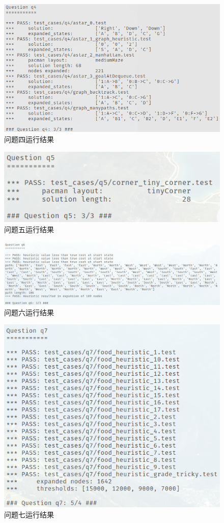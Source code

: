\documentclass[12pt,onecolumn]{report}
\theoremstyle{plain}
\numberwithin{figure}{section}
\begin{document}
\begin{figure}[H]
  \centering
  \includegraphics{figures/q4.png}
  \caption{问题四运行结果}
\end{figure}

\begin{figure}[H]
  \centering
  \includegraphics{figures/q5.png}
  \caption{问题五运行结果}
\end{figure}

\begin{figure}[H]
  \centering
  \includegraphics[width=\linewidth]{figures/q6.png}
  \caption{问题六运行结果}
\end{figure}

\begin{figure}[H]
  \centering
  \includegraphics[width=0.4\linewidth]{figures/q7.png}
  \caption{问题七运行结果}
\end{figure}
\end{document}
